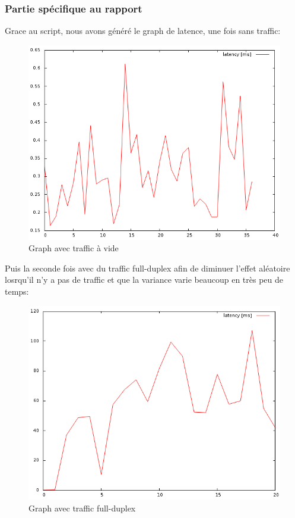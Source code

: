 \documentclass{article}
\begin{document}
\subsubsection{Partie spécifique au rapport}
Grace au script, nous avons généré le graph de latence, une fois sans traffic:
\begin{figure}[h]
  \centering
  \includegraphics[width=\linewidth]{./captures/6-plot.png}
  \caption{Graph avec traffic à vide}
  \label{fig:token-bucket}
\end{figure}
\newpage

Puis la seconde fois avec du traffic full-duplex afin de diminuer l'effet aléatoire losrqu'il n'y a pas de traffic et que la variance varie beaucoup en très peu de temps:
\begin{figure}[h]
  \centering
  \includegraphics[width=\linewidth]{./captures/6-plot-fullduplex.png}
  \caption{Graph avec traffic full-duplex}
  \label{fig:token-bucket}
\end{figure}
\newpage
\end{document}

